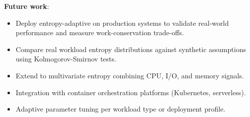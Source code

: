 \documentclass[11pt,letterpaper]{article}
\begin{document}
\textbf{Future work}:
\begin{itemize}
  \item Deploy entropy-adaptive on production systems to validate real-world performance and measure work-conservation trade-offs.
  \item Compare real workload entropy distributions against synthetic assumptions using Kolmogorov-Smirnov tests.
  \item Extend to multivariate entropy combining CPU, I/O, and memory signals.
  \item Integration with container orchestration platforms (Kubernetes, serverless).
  \item Adaptive parameter tuning per workload type or deployment profile.
\end{itemize}



\end{document}
